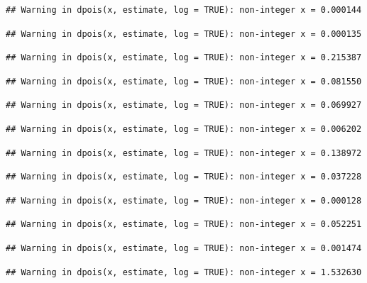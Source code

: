 \documentclass[]{article}
\begin{document}
\begin{verbatim}
## Warning in dpois(x, estimate, log = TRUE): non-integer x = 0.000144
\end{verbatim}

\begin{verbatim}
## Warning in dpois(x, estimate, log = TRUE): non-integer x = 0.000135
\end{verbatim}

\begin{verbatim}
## Warning in dpois(x, estimate, log = TRUE): non-integer x = 0.215387
\end{verbatim}

\begin{verbatim}
## Warning in dpois(x, estimate, log = TRUE): non-integer x = 0.081550
\end{verbatim}

\begin{verbatim}
## Warning in dpois(x, estimate, log = TRUE): non-integer x = 0.069927
\end{verbatim}

\begin{verbatim}
## Warning in dpois(x, estimate, log = TRUE): non-integer x = 0.006202
\end{verbatim}

\begin{verbatim}
## Warning in dpois(x, estimate, log = TRUE): non-integer x = 0.138972
\end{verbatim}

\begin{verbatim}
## Warning in dpois(x, estimate, log = TRUE): non-integer x = 0.037228
\end{verbatim}

\begin{verbatim}
## Warning in dpois(x, estimate, log = TRUE): non-integer x = 0.000128
\end{verbatim}

\begin{verbatim}
## Warning in dpois(x, estimate, log = TRUE): non-integer x = 0.052251
\end{verbatim}

\begin{verbatim}
## Warning in dpois(x, estimate, log = TRUE): non-integer x = 0.001474
\end{verbatim}

\begin{verbatim}
## Warning in dpois(x, estimate, log = TRUE): non-integer x = 1.532630
\end{verbatim}
\end{document}
